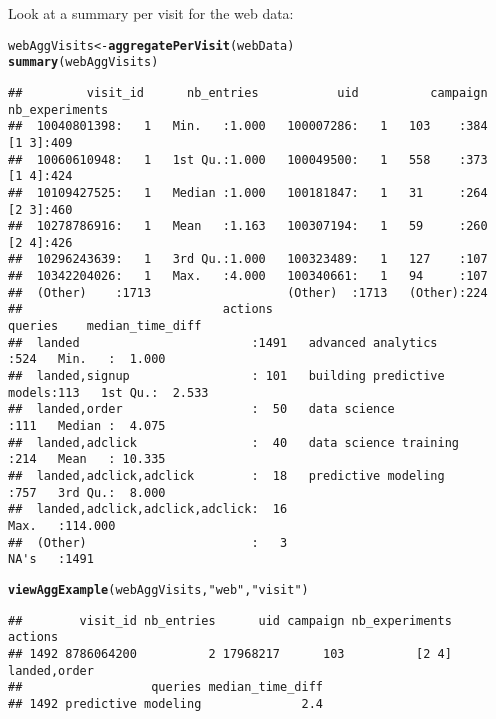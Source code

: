 \documentclass{article}\usepackage[]{graphicx}\usepackage[]{color}
\makeatletter
\newcommand{\hlstr}[1]{\textcolor[rgb]{0.192,0.494,0.8}{#1}}%
\newcommand{\hlstd}[1]{\textcolor[rgb]{0.345,0.345,0.345}{#1}}%
\newcommand{\hlkwb}[1]{\textcolor[rgb]{0.69,0.353,0.396}{#1}}%
\newcommand{\hlkwd}[1]{\textcolor[rgb]{0.737,0.353,0.396}{\textbf{#1}}}%
\newenvironment{kframe}{%
 \def\at@end@of@kframe{}%
 \ifinner\ifhmode%
  \def\at@end@of@kframe{\end{minipage}}%
  \begin{minipage}{\columnwidth}%
 \fi\fi%
 \def\FrameCommand##1{\hskip\@totalleftmargin \hskip-\fboxsep
 \colorbox{shadecolor}{##1}\hskip-\fboxsep
     \hskip-\linewidth \hskip-\@totalleftmargin \hskip\columnwidth}%
 \MakeFramed {\advance\hsize-\width
   \@totalleftmargin\z@ \linewidth\hsize
   \@setminipage}}%
 {\par\unskip\endMakeFramed%
 \at@end@of@kframe}
\newenvironment{knitrout}{}{} %
\makeatother
\begin{document}
Look at a summary per visit for the web data:
\begin{knitrout}
\color{fgcolor}\begin{kframe}
\begin{alltt}
\hlstd{webAggVisits} \hlkwb{<-} \hlkwd{aggregatePerVisit}\hlstd{(webData)}
\hlkwd{summary}\hlstd{(webAggVisits)}
\end{alltt}
\begin{verbatim}
##         visit_id      nb_entries           uid          campaign   nb_experiments
##  10040801398:   1   Min.   :1.000   100007286:   1   103    :384   [1 3]:409     
##  10060610948:   1   1st Qu.:1.000   100049500:   1   558    :373   [1 4]:424     
##  10109427525:   1   Median :1.000   100181847:   1   31     :264   [2 3]:460     
##  10278786916:   1   Mean   :1.163   100307194:   1   59     :260   [2 4]:426     
##  10296243639:   1   3rd Qu.:1.000   100323489:   1   127    :107                 
##  10342204026:   1   Max.   :4.000   100340661:   1   94     :107                 
##  (Other)    :1713                   (Other)  :1713   (Other):224                 
##                            actions                           queries    median_time_diff 
##  landed                        :1491   advanced analytics        :524   Min.   :  1.000  
##  landed,signup                 : 101   building predictive models:113   1st Qu.:  2.533  
##  landed,order                  :  50   data science              :111   Median :  4.075  
##  landed,adclick                :  40   data science training     :214   Mean   : 10.335  
##  landed,adclick,adclick        :  18   predictive modeling       :757   3rd Qu.:  8.000  
##  landed,adclick,adclick,adclick:  16                                    Max.   :114.000  
##  (Other)                       :   3                                    NA's   :1491
\end{verbatim}
\begin{alltt}
\hlkwd{viewAggExample}\hlstd{(webAggVisits,} \hlstr{"web"}\hlstd{,} \hlstr{"visit"}\hlstd{)}
\end{alltt}
\begin{verbatim}
##        visit_id nb_entries      uid campaign nb_experiments      actions
## 1492 8786064200          2 17968217      103          [2 4] landed,order
##                  queries median_time_diff
## 1492 predictive modeling              2.4
\end{verbatim}
\end{kframe}
\end{knitrout}
\end{document}
